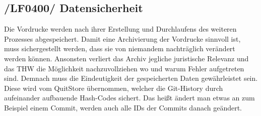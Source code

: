 \subsection{/LF0400/ Datensicherheit}
Die Vordrucke werden nach ihrer Erstellung und Durchlaufens des weiteren Prozesses abgespeichert.
Damit eine Archivierung der Vordrucke sinnvoll ist, muss sichergestellt werden, dass sie von niemandem  
nachträglich verändert werden können. Ansonsten verliert das Archiv jegliche juristische Relevanz und das THW die Möglichkeit nachzuvollziehen wo und warum Fehler aufgetreten sind. Demnach muss die Eindeutigkeit der gespeicherten Daten gewährleistet sein. Diese wird vom QuitStore übernommen, welcher die Git-History durch aufeinander aufbauende Hash-Codes sichert. Das heißt ändert man etwas an zum Beispiel einem Commit, werden auch alle IDs der Commits danach geändert.